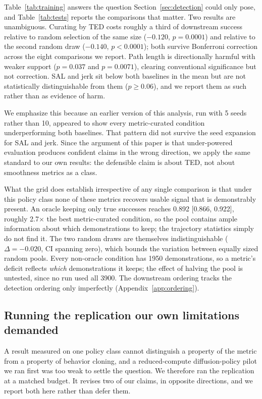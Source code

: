 \documentclass[10pt]{article}
\begin{document}
Table~\ref{tab:training} answers the question Section~\ref{sec:detection}
could only pose, and Table~\ref{tab:tests} reports the comparisons that
matter. Two results are unambiguous. Curating by TED costs roughly a third
of downstream success relative to random selection of the same size
($-0.120$, $p = 0.0001$) and relative to the second random draw ($-0.140$,
$p < 0.0001$); both survive Bonferroni correction across the eight
comparisons we report. Path length is directionally harmful with weaker
support ($p = 0.037$ and $p = 0.0071$), clearing conventional significance
but not correction. SAL and jerk sit below both baselines in the mean but
are not statistically distinguishable from them ($p \geq 0.06$), and we
report them as such rather than as evidence of harm.

We emphasize this because an earlier version of this analysis, run with
5 seeds rather than 10, appeared to show every metric-curated condition
underperforming both baselines. That pattern did not survive the seed
expansion for SAL and jerk. Since the argument of this paper is that
under-powered evaluation produces confident claims in the wrong direction,
we apply the same standard to our own results: the defensible claim is about
TED, not about smoothness metrics as a class.

What the grid does establish irrespective of any single comparison is that
under this policy class none of these metrics recovers usable signal that is
demonstrably present.
An oracle keeping only true successes reaches 0.892 [0.866, 0.922], roughly
2.7$\times$ the best metric-curated condition, so the pool contains ample
information about which demonstrations to keep; the trajectory statistics
simply do not find it. The two random draws are themselves indistinguishable
($\Delta = -0.020$, CI spanning zero), which bounds the variation between
equally sized random pools. Every non-oracle condition has 1950
demonstrations, so a metric's deficit reflects \emph{which} demonstrations
it keeps; the effect of halving the pool is untested, since no run used all
3900. The downstream ordering tracks the detection
ordering only imperfectly (Appendix~\ref{app:ordering}).

\subsection{Running the replication our own limitations demanded}
\label{sec:crossarch}

A result measured on one policy class cannot distinguish a property of the
metric from a property of behavior cloning, and a reduced-compute
diffusion-policy pilot we ran first was too weak to settle the question. We
therefore ran the replication at a matched budget. It revises two of our
claims, in opposite directions, and we report both here rather than
defer them.
\end{document}

